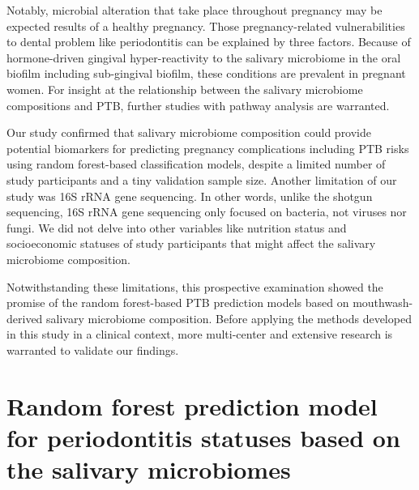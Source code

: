 \documentclass[11pt, a4paper, onecolumn, oneside]{report}
\begin{document}
            Notably, microbial alteration that take place throughout pregnancy may be expected results of a healthy pregnancy. Those pregnancy-related vulnerabilities to dental problem like periodontitis can be explained by three factors. Because of hormone-driven gingival hyper-reactivity to the salivary microbiome in the oral biofilm including sub-gingival biofilm, these conditions are prevalent in pregnant women. For insight at the relationship between the salivary microbiome compositions and PTB, further studies with pathway analysis are warranted.

            Our study confirmed that salivary microbiome composition could provide potential biomarkers for predicting pregnancy complications including PTB risks using random forest-based classification models, despite a limited number of study participants and a tiny validation sample size. Another limitation of our study was 16S rRNA gene sequencing. In other words, unlike the shotgun sequencing, 16S rRNA gene sequencing only focused on bacteria, not viruses nor fungi. We did not delve into other variables like nutrition status and socioeconomic statuses of study participants that might affect the salivary microbiome composition.

            Notwithstanding these limitations, this prospective examination showed the promise of the random forest-based PTB prediction models based on mouthwash-derived salivary microbiome composition. Before applying the methods developed in this study in a clinical context, more multi-center and extensive research is warranted to validate our findings.
        \newpage

    \section{Random forest prediction model for periodontitis statuses based on the salivary microbiomes}
        \label{section:Periodontitis}
\end{document}
